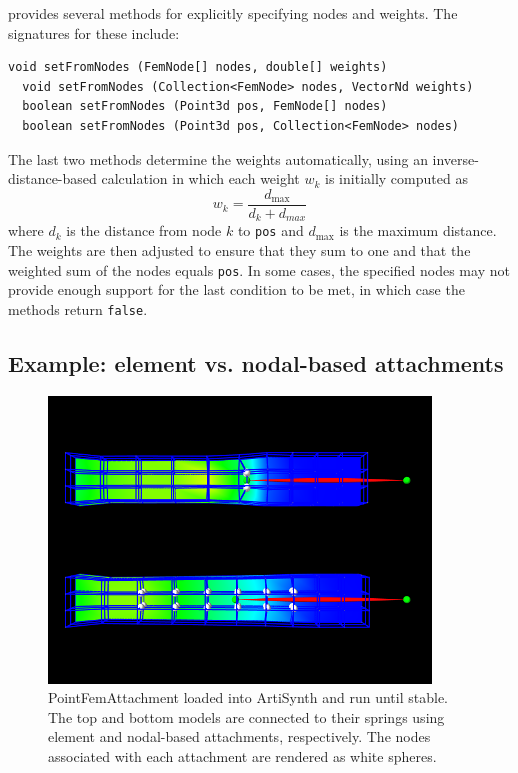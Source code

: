  provides
several methods for explicitly specifying nodes and weights. The
signatures for these include:
\begin{lstlisting}[]
  void setFromNodes (FemNode[] nodes, double[] weights)
  void setFromNodes (Collection<FemNode> nodes, VectorNd weights)
  boolean setFromNodes (Point3d pos, FemNode[] nodes)
  boolean setFromNodes (Point3d pos, Collection<FemNode> nodes)
\end{lstlisting}
The last two methods determine the weights automatically, using an
inverse-distance-based calculation in which each weight $w_k$
is initially computed as
%
\begin{equation}
w_k = \frac{d_{\text{max}}}{d_k + d_{max}}
\label{invDistWeights:eqn}
\end{equation}
%
where $d_k$ is the distance from node $k$ to {\tt pos} and
$d_{\text{max}}$ is the maximum distance. The weights are then
adjusted to ensure that they sum to one and that the weighted sum of
the nodes equals {\tt pos}. In some cases, the specified nodes
may not provide enough support for the last condition to be
met, in which case the methods return {\tt false}.

\subsection{Example: element vs. nodal-based attachments}

\begin{figure}[ht]
\centering
{}
\includegraphics[width=\imglength]{images/PointFemAttachment}
\caption{PointFemAttachment loaded into ArtiSynth and run until stable.
The top and bottom models are connected to their springs using element
and nodal-based attachments, respectively.  The nodes associated with
each attachment are rendered as white spheres.}
\label{fig:fem:pointFemAttachment}
\end{figure}

